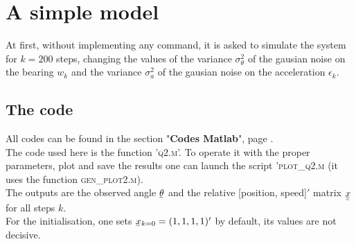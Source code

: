\documentclass[english,DIV=13]{scrartcl}
\newcommand{\ubar}[1]{\underaccent{\bar}{#1}}
\newcommand{\uvec}[1]{\ubar{#1}}
\newcommand{\umatrix}[1]{\ubar{\ubar{#1}}}
\begin{document}
\section{A simple model}
At first, without implementing any command, it is asked to simulate the system for $k=200$ steps, changing
the values of the variance $\sigma^2_{\theta}$ of the gausian noise on the bearing $w_k$  and
the variance  $\sigma^2_a$ of the gausian noise on the acceleration $\epsilon_k$.

\subsection*{The code}
All codes can be found in the section "\textbf{Codes Matlab}", page \pageref{codes}.\\
The code used here is the function '\textsc{q2.m}'. To operate it with the proper
parameters, plot and save the results one can launch the script '\textsc{plot\_q2.m}
(it uses the function \textsc{gen\_plot2.m}).\\
The outputs are the observed angle $\uvec{\theta}$ and the relative [position, speed]$'$
matrix $\umatrix{x}$ for all steps $k$. \\
For the initialisation, one sets $\uvec{x}_{k=0} = (1,1,1,1)'$ by default, its values are not decisive. \\
\end{document}
